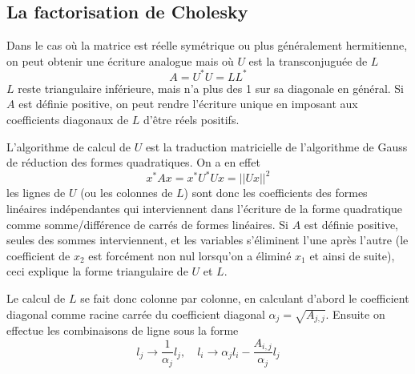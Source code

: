 \documentclass[a4paper,11pt]{article}
\begin{document}
\subsection{La factorisation de Cholesky} 
Dans le cas o\`u la matrice est r\'eelle sym\'etrique ou plus
g\'en\'eralement hermitienne, on peut obtenir une \'ecriture analogue
mais o\`u $U$ est la transconjugu\'ee de $L$
\[ A=U^* U = L L^* \]
$L$ reste triangulaire
inf\'erieure, mais n'a plus des 1 sur sa diagonale en g\'en\'eral. Si
$A$ est d\'efinie positive, on peut rendre l'\'ecriture unique en
imposant aux coefficients diagonaux de $L$ d'\^etre r\'eels positifs.

L'algorithme de calcul de $U$ est la traduction matricielle de l'algorithme
de Gauss de réduction des formes quadratiques. On a en effet
\[ x^* A x=x^* U^* U x = ||Ux||^2 \]
les lignes de $U$ (ou les colonnes de $L$) sont donc les coefficients
des formes linéaires indépendantes qui interviennent dans l'écriture
de la forme quadratique comme somme/différence de carrés de formes
linéaires. Si $A$
est définie positive, seules des sommes interviennent, et les
variables s'éliminent l'une après l'autre (le coefficient de $x_2$ est forcément
non nul lorsqu'on a éliminé $x_1$ et ainsi de suite), ceci explique
la forme triangulaire de $U$ et $L$.

Le calcul de $L$ se fait donc colonne par colonne, en calculant d'abord le
coefficient diagonal comme racine carr\'ee du coefficient diagonal 
$\alpha_j=\sqrt{A_{j,j}}$.
Ensuite on effectue les combinaisons de ligne sous la forme
\[ l_j \rightarrow \frac{1}{\alpha_j}l_j, \quad  l_i \rightarrow \alpha_j l_i - \frac{A_{i,j}}{\alpha_j} l_j \]
\end{document}
